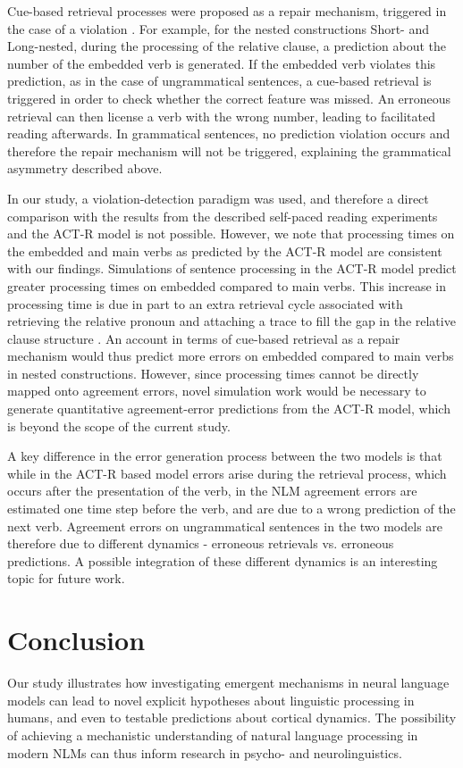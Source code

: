 Cue-based retrieval processes were proposed as a repair mechanism, triggered in the case of a violation \citep{wagers2009agreement, lago2015agreement}. For example, for the nested constructions Short- and Long-nested, during the processing of the relative clause, a prediction about the number of the embedded verb is generated. If the embedded verb violates this prediction, as in the case of ungrammatical sentences, a cue-based retrieval is triggered in order to check whether the correct feature was missed. An erroneous retrieval can then license a verb with the wrong number, leading to facilitated reading afterwards. In grammatical sentences, no prediction violation occurs and therefore the repair mechanism will not be triggered, explaining the grammatical asymmetry described above. 

In our study, a violation-detection paradigm was used, and therefore a direct comparison with the results from the described self-paced reading experiments and the ACT-R model is not possible. However, we note that processing times on the embedded and main verbs as predicted by the ACT-R model are consistent with our findings. Simulations of sentence processing in the ACT-R model predict greater processing times on embedded compared to main verbs. This increase in processing time is due in part to an extra retrieval cycle associated with retrieving the relative pronoun and attaching a trace to fill the gap in the relative clause structure \citep{lewis2005activation}. An account in terms of cue-based retrieval as a repair mechanism would thus predict more errors on embedded compared to main verbs in nested constructions. However, since processing times cannot be directly mapped onto agreement errors, novel simulation work would be necessary to generate quantitative agreement-error predictions from the ACT-R model, which is beyond the scope of the current study.

A key difference in the error generation process between the two models is that while in the ACT-R based model errors arise during the retrieval process, which occurs after the presentation of the verb, in the NLM agreement errors are estimated one time step before the verb, and are due to a wrong prediction of the next verb. Agreement errors on ungrammatical sentences in the two models are therefore due to different dynamics - erroneous retrievals vs. erroneous predictions. A possible integration of these different dynamics is an interesting topic for future work.

\section{Conclusion}
Our study illustrates how investigating emergent mechanisms in neural language models can lead to novel explicit hypotheses about linguistic processing in humans, and even to testable predictions about cortical dynamics. The possibility of achieving a mechanistic understanding of natural language processing in modern NLMs can thus inform research in psycho- and neurolinguistics.

